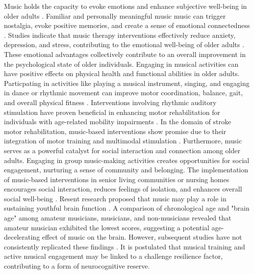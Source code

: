 Music holds the capacity to evoke emotions and enhance subjective well-being in older adults \cite{Croom2015}. Familiar and personally meaningful music music can trigger nostalgia, evoke positive memories, and create a sense of emotional connectedness \cite{Creech2013}. Studies indicate that music therapy interventions effectively reduce anxiety, depression, and stress, contributing to the emotional well-being of older adults \cite{Guetin2013}. These emotional advantages collectively contribute to an overall improvement in the psychological state of older individuals. 
Engaging in musical activities can have positive effects on physical health and functional abilities in older adults. Particpating in activities like playing a musical instrument, singing, and engaging in dance or rhythmic movement can improve motor coordination, balance, gait, and overall physical fitness \cite{Creech2013}. Interventions involving rhythmic auditory stimulation have proven beneficial in enhancing motor rehabilitation for individuals with age-related mobility impairments \cite{Thaut2015}. In the domain of stroke motor rehabilitation, music-based interventions show promise due to their integration of motor training and multimodal stimulation \cite{Grau-Sanchez2020, Altenmuller2020}. 
Furthermore, music serves as a powerful catalyst for social interaction and connection among older adults. Engaging in group music-making activities creates opportunities for social engagement, nurturing a sense of community and belonging. The implementation of music-based interventions in senior living communities or nursing homes encourages social interaction, reduces feelings of isolation, and enhances overall social well-being \cite{Creech2013}.
Resent research proposed that music may play a role in sustaining youthful brain function \cite{Rogenmoser2018}. A comparison of chronological age and  "brain age" among amateur musicians, musicians, and non-musicians revealed that amateur musician exhibited the lowest scores, suggesting a potential age-decelerating effect of music on the brain. However, subsequent studies have not consistently replicated these findings \cite{Matziorinis2023}. It is postulated that musical training and active musical engagement may be linked to a challenge resilience factor, contributing to a form of neurocognitive reserve.
